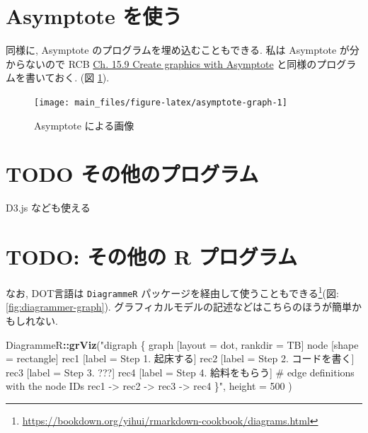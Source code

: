 \documentclass[
  nomag]{bxjsbook}
\newenvironment{Shaded}{\begin{snugshade}}{\end{snugshade}}
\newcommand{\DataTypeTok}[1]{\textcolor[rgb]{0.13,0.29,0.53}{#1}}
\newcommand{\DecValTok}[1]{\textcolor[rgb]{0.00,0.00,0.81}{#1}}
\newcommand{\KeywordTok}[1]{\textcolor[rgb]{0.13,0.29,0.53}{\textbf{#1}}}
\newcommand{\NormalTok}[1]{#1}
\newcommand{\OperatorTok}[1]{\textcolor[rgb]{0.81,0.36,0.00}{\textbf{#1}}}
\newcommand{\StringTok}[1]{\textcolor[rgb]{0.31,0.60,0.02}{#1}}
\theoremstyle{definition}
\theoremstyle{definition}
\theoremstyle{definition}
\theoremstyle{remark}
\begin{document}
\hypertarget{asymptote-ux3092ux4f7fux3046}{%
\section{Asymptote を使う}\label{asymptote-ux3092ux4f7fux3046}}

同様に, Asymptote のプログラムを埋め込むこともできる. 私は Asymptote
が分からないので RCB
\href{https://bookdown.org/yihui/rmarkdown-cookbook/eng-asy.html}{Ch.
15.9 Create graphics with Asymptote} と同様のプログラムを書いておく. (図
\ref{fig:asymptote-graph}).

\begin{figure}

{\centering \texttt{[image: main\_files/figure-latex/asymptote-graph-1]} 

}

\caption{Asymptote による画像}\label{fig:asymptote-graph}
\end{figure}

\hypertarget{todo-ux305dux306eux4ed6ux306eux30d7ux30edux30b0ux30e9ux30e0}{%
\section{TODO
その他のプログラム}\label{todo-ux305dux306eux4ed6ux306eux30d7ux30edux30b0ux30e9ux30e0}}

D3.js なども使える

\hypertarget{todo-ux305dux306eux4ed6ux306e-r-ux30d7ux30edux30b0ux30e9ux30e0}{%
\section{TODO: その他の R
プログラム}\label{todo-ux305dux306eux4ed6ux306e-r-ux30d7ux30edux30b0ux30e9ux30e0}}

なお, DOT言語は \texttt{DiagrammeR}
パッケージを経由して使うこともできる\footnote{\url{https://bookdown.org/yihui/rmarkdown-cookbook/diagrams.html}}(図:
\ref{fig:diagrammer-graph}).
グラフィカルモデルの記述などはこちらのほうが簡単かもしれない.




\begin{Shaded}
\begin{Highlighting}[numbers=left,,]
\NormalTok{DiagrammeR}\OperatorTok{::}\KeywordTok{grViz}\NormalTok{(}\StringTok{"digraph \{}
\StringTok{  graph [layout = dot, rankdir = TB]}
\StringTok{  }
\StringTok{  node [shape = rectangle]        }
\StringTok{  rec1 [label = \textquotesingle{}Step 1. 起床する\textquotesingle{}]}
\StringTok{  rec2 [label = \textquotesingle{}Step 2. コードを書く\textquotesingle{}]}
\StringTok{  rec3 [label =  \textquotesingle{}Step 3. ???\textquotesingle{}]}
\StringTok{  rec4 [label = \textquotesingle{}Step 4. 給料をもらう\textquotesingle{}]}
\StringTok{  }
\StringTok{  \# edge definitions with the node IDs}
\StringTok{  rec1 {-}\textgreater{} rec2 {-}\textgreater{} rec3 {-}\textgreater{} rec4}
\StringTok{  \}"}\NormalTok{,}
  \DataTypeTok{height =} \DecValTok{500}
\NormalTok{)}
\end{Highlighting}
\end{Shaded}
\end{document}
